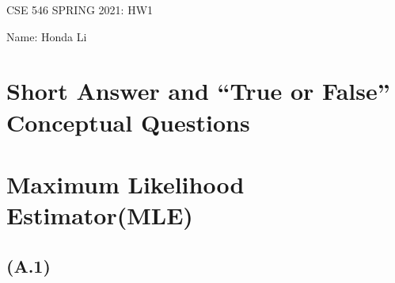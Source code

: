 \documentclass[]{article}
\begin{document}
\begin{center}
    CSE 546 SPRING 2021: HW1 
\end{center}
\begin{center}
    Name: Honda Li
\end{center}

\section*{Short Answer and ``True or False'' Conceptual Questions}

\section*{Maximum Likelihood Estimator(MLE)}
    \subsection*{(A.1)}
\end{document}
